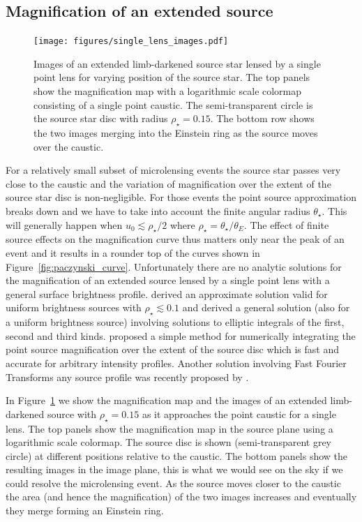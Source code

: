 \documentclass[12pt,dvipsnames]{report}
\begin{document}
\subsection{Magnification of an extended source}
\begin{figure}[t]
    \begin{centering}
        \texttt{[image: figures/single\_lens\_images.pdf]}
        \caption{Images of an extended limb-darkened source star lensed by a single
            point lens for varying position of the source star. The top panels show the magnification map with a logarithmic scale
            colormap  consisting of a single point caustic. The semi-transparent circle
            is the source star disc with radius $\rho_\star=0.15$. The bottom row shows
            the two images merging into the Einstein ring as the source moves over the caustic.}
        \label{fig:single_lens_images}
    \end{centering}
\end{figure}
For a relatively small subset of microlensing events the source star passes
very close to the caustic and the variation of magnification over the extent of
the source star disc is non-negligible. For those events the point source
approximation breaks down and we have to take into account the finite angular
radius $\theta_\star$. This will generally happen when $u_0 \lesssim
    \rho_\star/2$ \citep{1997ApJ...477..580G} where
$\rho_\star=\theta_\star/\theta_E$. The effect of finite source effects on the
magnification curve thus matters only near the peak of an event and it results
in a rounder top of the curves shown in Figure~\ref{fig:paczynski_curve}.
Unfortunately there are no analytic solutions for the magnification of an
extended source lensed by a single point lens with a general surface brightness
profile. \citet{1994ApJ...421L..71G} derived an approximate solution valid for
uniform brightness sources with $\rho_\star\lesssim 0.1$ and
\citet{1994ApJ...430..505W} derived a general solution (also for a uniform
brightness source) involving solutions to elliptic integrals of the first,
second and third kinds. \citet{2009ApJ...695..200L} proposed a simple method for
numerically integrating the point source magnification over the extent of the source
disc which is fast and accurate for arbitrary intensity profiles.
Another solution involving Fast Fourier Transforms any source profile was
recently proposed by \citet{2022arXiv220306637S}.

In Figure~\ref{fig:single_lens_images} we show the magnification map and the
images of an extended limb-darkened source with $\rho_\star=0.15$ as it
approaches the point caustic for a single lens. The top panels show the
magnification map in the source plane using a logarithmic scale colormap. The
source disc is shown (semi-transparent grey circle) at different positions
relative to the caustic. The bottom panels show the resulting images in the
image plane, this is what we would see on the sky if we could resolve the
microlensing event. As the source moves closer to the caustic the area (and
hence the magnification) of the two images increases and eventually they merge
forming an Einstein ring.
\end{document}
